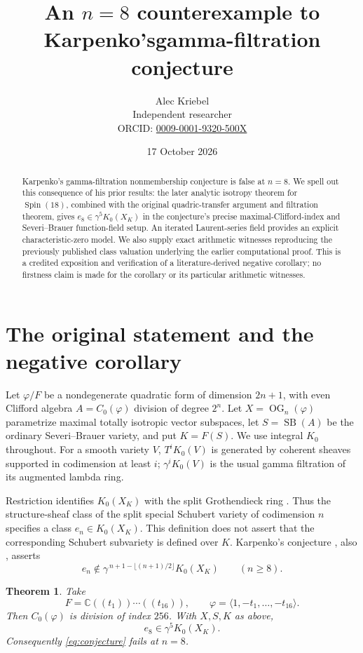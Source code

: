 \documentclass[11pt]{article}
\title{An $n=8$ counterexample to Karpenko's\newline gamma-filtration conjecture}
\author{Alec Kriebel\\[2pt]\small Independent researcher\\
\small ORCID: \href{https://orcid.org/0009-0001-9320-500X}{0009-0001-9320-500X}}
\date{17 October 2026}
\newtheorem{theorem}{Theorem}
\newcommand{\OG}{\operatorname{OG}}
\newcommand{\SB}{\operatorname{SB}}
\newcommand{\C}{\mathbb C}
\begin{document}
\maketitle
\begin{abstract}
Karpenko's gamma-filtration nonmembership conjecture is false at $n=8$.
We spell out this consequence of his prior results: the later analytic
isotropy theorem for $\operatorname{Spin}(18)$, combined with the original
quadric-transfer argument and filtration theorem, gives
$e_8\in\gamma^5K_0(X_K)$ in the conjecture's precise maximal-Clifford-index
and Severi--Brauer function-field setup. An iterated Laurent-series field
provides an explicit characteristic-zero model. We also supply exact
arithmetic witnesses reproducing the previously published class valuation
underlying the earlier computational proof. This is a credited exposition
and verification of a literature-derived negative corollary; no firstness
claim is made for the corollary or its particular arithmetic witnesses.
\end{abstract}

\section{The original statement and the negative corollary}

Let $\varphi/F$ be a nondegenerate quadratic form of dimension $2n+1$,
with even Clifford algebra $A=C_0(\varphi)$ division of degree $2^n$.
Let $X=\OG_n(\varphi)$ parametrize maximal totally isotropic vector
subspaces, let $S=\SB(A)$ be the ordinary Severi--Brauer variety, and put
$K=F(S)$. We use integral $K_0$ throughout. For a smooth variety $V$,
$T^iK_0(V)$ is generated by coherent sheaves supported in codimension
at least $i$; $\gamma^iK_0(V)$ is the usual gamma filtration of its
augmented lambda ring.

Restriction identifies $K_0(X_K)$ with the split Grothendieck ring
\cite[\S4]{around}. Thus the structure-sheaf class of the split special
Schubert variety of codimension $n$ specifies a class
$e_n\in K_0(X_K)$. This definition does not assert that the corresponding
Schubert subvariety is defined over $K$. Karpenko's conjecture
\cite[Conjecture 3]{owr}, also \cite[Conjecture 4.7]{around}, asserts
\begin{equation}\label{eq:conjecture}
 e_n\notin\gamma^{\,n+1-\lfloor(n+1)/2\rfloor}K_0(X_K)
 \qquad(n\geq8).
\end{equation}

\begin{theorem}\label{thm:main}
Take
\[
 F=\C((t_1))\cdots((t_{16})),\qquad
 \varphi=\langle1,-t_1,\ldots,-t_{16}\rangle.
\]
Then $C_0(\varphi)$ is division of index $256$. With $X,S,K$ as above,
\[
                     e_8\in\gamma^5K_0(X_K).
\]
Consequently \eqref{eq:conjecture} fails at $n=8$.
\end{theorem}
\end{document}
